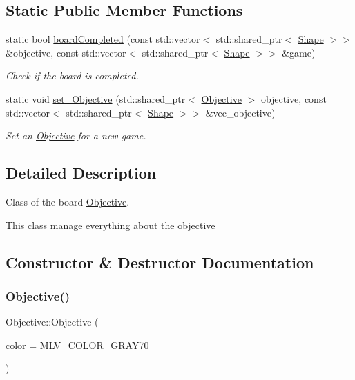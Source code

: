 \subsection*{Static Public Member Functions}
\begin{DoxyCompactItemize}
\item 
static bool \hyperlink{classObjective_aba5fe938ebccb3825d6b03cd789d6d61}{board\+Completed} (const std\+::vector$<$ std\+::shared\+\_\+ptr$<$ \hyperlink{classShape}{Shape} $>$$>$ \&objective, const std\+::vector$<$ std\+::shared\+\_\+ptr$<$ \hyperlink{classShape}{Shape} $>$$>$ \&game)
\begin{DoxyCompactList}\small\item\em Check if the board is completed. \end{DoxyCompactList}\item 
static void \hyperlink{classObjective_adecebbf5e11f3e778b1b7f48735a0765}{set\+\_\+\+Objective} (std\+::shared\+\_\+ptr$<$ \hyperlink{classObjective}{Objective} $>$ objective, const std\+::vector$<$ std\+::shared\+\_\+ptr$<$ \hyperlink{classShape}{Shape} $>$$>$ \&vec\+\_\+objective)
\begin{DoxyCompactList}\small\item\em Set an \hyperlink{classObjective}{Objective} for a new game. \end{DoxyCompactList}\end{DoxyCompactItemize}


\subsection{Detailed Description}
Class of the board \hyperlink{classObjective}{Objective}. 

This class manage everything about the objective 

\subsection{Constructor \& Destructor Documentation}
\mbox{\label{classObjective_ae515d38979a806a95f9476f4437311ab}} 
\subsubsection{\texorpdfstring{Objective()}{Objective()}\hspace{0.1cm}{\footnotesize\ttfamily [1/2]}}
{\footnotesize\ttfamily Objective\+::\+Objective (\begin{DoxyParamCaption}\item[{M\+L\+V\+\_\+\+Color}]{color = {\ttfamily MLV\+\_\+COLOR\+\_\+GRAY70} }\end{DoxyParamCaption})\hspace{0.3cm}{\ttfamily [explicit]}}



